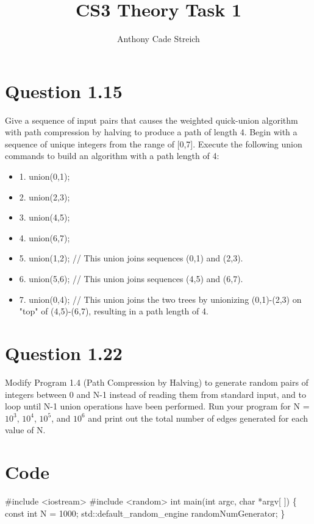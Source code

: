 \documentclass[]{article}
\title{CS3 Theory Task 1}
\author{Anthony Cade Streich}
\begin{document}
\maketitle
\section*{Question 1.15}
Give a sequence of input pairs that causes the weighted quick-union algorithm with path compression by halving to produce a path of length 4.
\newline
\newline
\newline
Begin with a sequence of unique integers from the range of [0,7]. Execute the following union commands to build an algorithm with a path length of 4:

\begin{itemize}
	\item {1. union(0,1);}
	\item {2. union(2,3);}
	\item {3. union(4,5);}
	\item {4. union(6,7);}
	
	\item {5. union(1,2); // This union joins sequences (0,1) and (2,3).}
	\item {6. union(5,6); // This union joins sequences (4,5) and (6,7).}
	\item {7. union(0,4); // This union joins the two trees by unionizing (0,1)-(2,3) on "top" of (4,5)-(6,7), resulting in a path length of 4.}
\end{itemize}

\pagebreak

\section*{Question 1.22}
Modify Program 1.4 (Path Compression by Halving) to generate random pairs of integers between 0 and N-1 instead of reading them from standard input, and to loop until N-1 union operations have been performed. Run your program for N = $10^{3}$, $10^{4}$, $10^{5}$, and $10^{6}$ and print out the total number of edges generated for each value of N.

\section*{Code}
\#include <iostream>\newline
\#include <random>\newline
\newline
int main(int argc, char *argv[ ])\newline
\{\newline
\indent const int N = 1000;\newline
\indent std::default\_random\_engine randomNumGenerator;\newline
\newline
\}
\end{document}
